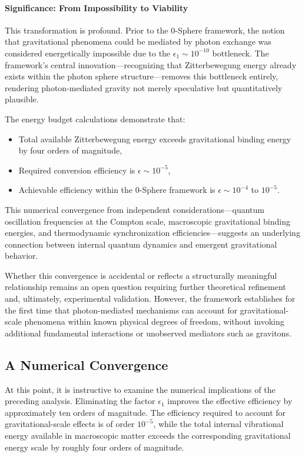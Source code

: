 \documentclass[12pt,letterpaper]{article}
\begin{document}
\paragraph{Significance: From Impossibility to Viability}

This transformation is profound. Prior to the 0-Sphere framework, the notion that gravitational phenomena could be mediated by photon exchange was considered energetically impossible due to the $\epsilon_1 \sim 10^{-10}$ bottleneck. The framework's central innovation—recognizing that Zitterbewegung energy already exists within the photon sphere structure—removes this bottleneck entirely, rendering photon-mediated gravity not merely speculative but quantitatively plausible.

The energy budget calculations demonstrate that:
\begin{itemize}
\item Total available Zitterbewegung energy exceeds gravitational binding energy by four orders of magnitude,
\item Required conversion efficiency is $\epsilon \sim 10^{-5}$,
\item Achievable efficiency within the 0-Sphere framework is $\epsilon \sim 10^{-4}$ to $10^{-5}$.
\end{itemize}

This numerical convergence from independent considerations—quantum oscillation frequencies at the Compton scale, macroscopic gravitational binding energies, and thermodynamic synchronization efficiencies—suggests an underlying connection between internal quantum dynamics and emergent gravitational behavior.

Whether this convergence is accidental or reflects a structurally meaningful relationship remains an open question requiring further theoretical refinement and, ultimately, experimental validation. However, the framework establishes for the first time that photon-mediated mechanisms can account for gravitational-scale phenomena within known physical degrees of freedom, without invoking additional fundamental interactions or unobserved mediators such as gravitons.


\subsection{A Numerical Convergence}
\label{subsec:numerical_convergence}

At this point, it is instructive to examine the numerical implications of the preceding analysis. Eliminating the factor $\epsilon_1$ improves the effective efficiency by approximately ten orders of magnitude. The efficiency required to account for gravitational-scale effects is of order $10^{-5}$, while the total internal vibrational energy available in macroscopic matter exceeds the corresponding gravitational energy scale by roughly four orders of magnitude.
\end{document}
